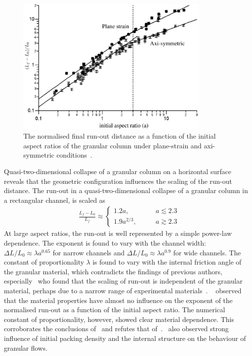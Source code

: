 \begin{figure}[tbhp]
\centering
\includegraphics[width=0.85\textwidth]{Runout_Exp}
\caption{The normalised final run-out distance as a function of the initial 
aspect ratios of the granular column under plane-strain and axi-symmetric 
conditions~\citep{Lajeunesse2004}.}
\label{fig:Runout_Exp}
\end{figure}

Quasi-two-dimensional collapse of a granular column on a horizontal 
surface~\citep{Lajeunesse2005} reveals that the geometric configuration 
influences the scaling of the run-out distance. The run-out in a 
quasi-two-dimensional collapse of a granular column in a rectangular channel, 
is scaled as 
\begin{align}
& \frac{\textit{L}_{\textit{f}}- 
\textit{L}_{\textit{0}}}{\textit{L}_{\textit{f}}} \approx
\begin{cases} 
1.2\textit{a}, \qquad &\textit{a} \lesssim 2.3 \\
1.9\textit{a}^{2/3}, \qquad &\textit{a} \gtrsim 2.3
\end{cases}
\end{align} 
At large aspect ratios, the run-out is well represented by a simple power-law 
dependence. The exponent is found to vary with the channel width: $\Delta 
\textit{L}/\textit{L}_{\textit{0}} \approx \lambda \textit{a}^{0.65}$ for 
narrow channels and $\Delta \textit{L}/\textit{L}_{\textit{0}} \approx \lambda 
\textit{a}^{0.9}$ for wide channels. The constant of proportionality $\lambda$ 
is found to vary with the internal friction angle of the granular material, 
which contradicts the findings of previous authors, especially~\citet{Lube2005} 
who found that the scaling of run-out is independent of the granular material, 
perhaps due to a narrow range of experimental materials~\citep{Staron2005}.
~\citet{Balmforth2005} observed that the material properties have almost no 
influence on the exponent of the normalised run-out as a function of the 
initial aspect ratio. The numerical constant of proportionality, however, 
showed clear material dependence. This corroborates the conclusions 
of~\citet{Lajeunesse2004} and refutes that 
of~\citet{Lube2005}.~\citet{Daerr1999} also observed strong influence of 
initial packing density and the internal structure on the behaviour of 
granular flows. 


